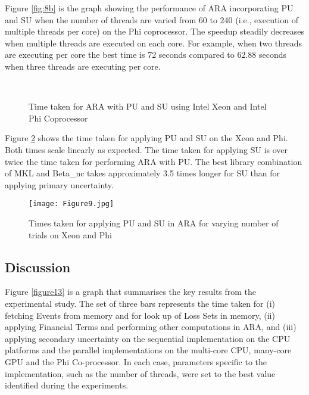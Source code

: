 Figure \ref{fig:8b} is the graph showing the performance of ARA incorporating PU and SU when the number of threads are varied from 60 to 240 (i.e., execution of multiple threads per core) on the Phi coprocessor. The speedup steadily decreases when multiple threads are executed on each core. For example, when two threads are executing per core the best time is 72 seconds compared to 62.88 seconds when three threads are executing per core. 

\begin{figure} \centering
	 \\
\caption{Time taken for ARA with PU and SU using Intel Xeon and Intel Phi Coprocessor}
\label{figure8}
\end{figure}

Figure \ref{figure9} shows the time taken for applying PU and SU on the Xeon and Phi. Both times scale linearly as expected. The time taken for applying SU is over twice the time taken for performing ARA with PU. The best library combination of MKL and Beta\_nc takes approximately 3.5 times longer for SU than for applying primary uncertainty. 

\begin{figure}
	\centering
	\texttt{[image: Figure9.jpg]}
	\caption{Times taken for applying PU and SU in ARA for varying number of trials on Xeon and Phi}
	\label{figure9}
\end{figure}



\subsection{Discussion}
\label{experimentalresults:discussion}

Figure \ref{figure13} is a graph that summarises the key results from the experimental study. The set of three bars represents the time taken for (i) fetching Events from memory and for look up of Loss Sets in memory, (ii) applying Financial Terms and performing other computations in ARA, and (iii) applying secondary uncertainty on the sequential implementation on the CPU platforms and the parallel implementations on the multi-core CPU, many-core GPU and the Phi Co-processor. In each case, parameters specific to the implementation, such as the number of threads, were set to the best value identified during the experiments.

